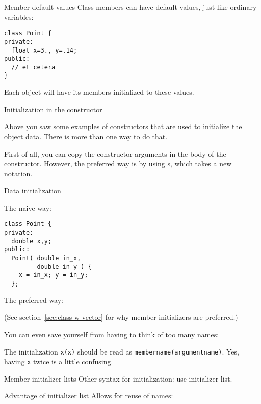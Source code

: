 \begin{block}{Member default values}
  \label{sl:class-defval}
  Class members can have default values, just like ordinary variables:
\begin{lstlisting}
class Point {
private:
  float x=3., y=.14;
public:
  // et cetera
}
\end{lstlisting}
  Each object will have its members initialized to these values.
\end{block}

 {Initialization in the constructor}


Above you saw some examples of constructors that are used
to initialize the object data.
There is more than one way to do that.

First of all, you can copy the constructor arguments
in the body of the constructor.
However, the preferred way is by using s,
which takes a new notation.

\begin{block}{Data initialization}
  \label{sl:contructor-init-2}
\begin{multicols}{2}
The naive way:
  \lstset{style=snippetcode}
\begin{lstlisting}
class Point {
private:
  double x,y;
public:
  Point( double in_x,
         double in_y ) {
    x = in_x; y = in_y;
  };
\end{lstlisting}
\columnbreak
The preferred way:
\end{multicols}
\end{block}

(See section~\ref{sec:class-w-vector} for why member initializers are preferred.)

You can even save yourself from having to think of too many names:


The initialization \lstinline{x(x)} should be read as
\lstinline{membername(argumentname)}.
Yes, having \lstinline{x} twice is a little confusing.

\begin{slide}{Member initializer lists}
  \label{sl:class-init}
  Other syntax for initialization:\slidenewline
  use initializer list.
\end{slide}

\begin{slide}{Advantage of initializer list}
  \label{sl:class-init-why}
  Allows for reuse of names:
\end{slide}

